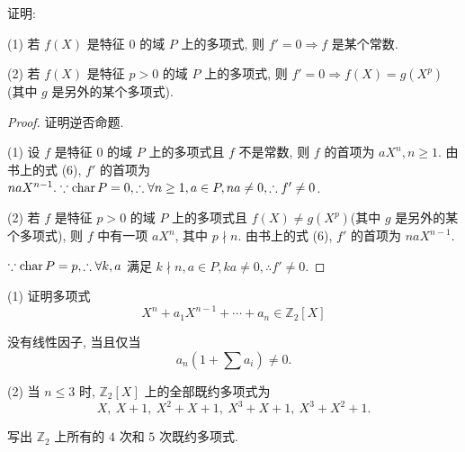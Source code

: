 \documentclass[color=black,device=normal,lang=cn,mode=geye]{elegantnote}
\begin{document}
\begin{exercise}%
    证明:
    
    (1) 若 $f(X)$ 是特征 $0$ 的域 $P$ 上的多项式, 则 $f'=0\Rightarrow f$ 是某个常数.
    
    (2) 若 $f(X)$ 是特征 $p>0$ 的域 $P$ 上的多项式, 则 $f'=0\Rightarrow f(X)=g(X^p)$(其中 $g$ 是另外的某个多项式).
\end{exercise}
\begin{proof}
    证明逆否命题.

    (1) 设 $f$ 是特征 $0$ 的域 $P$ 上的多项式且 $f$ 不是常数, 则 $f$ 的首项为 $aX^n,n\geq1$. 由书上的式 (6), $f'$ 的首项为 $naX^{n-1}.\because\operatorname{char} P=0,\therefore\forall n\geq1,a\in P,na\neq0,\therefore f'\neq0$.

    (2) 若 $f$ 是特征 $p>0$ 的域 $P$ 上的多项式且 $f(X)\neq g(X^p)$(其中 $g$ 是另外的某个多项式), 则 $f$ 中有一项 $aX^n$, 其中 $p\nmid n$. 由书上的式 (6), $f'$ 的首项为 $naX^{n-1}$.
    
    $\because\operatorname{char} P=p,\therefore\forall k,a$ 满足 $k\nmid n,a\in P,ka\neq0,\therefore f'\neq0$.
\end{proof}
\addtocounter{exercise}{2}
\begin{exercise}%
    (1) 证明多项式
    \begin{equation}\label{eq5.1}
        X^n+a_1X^{n-1}+\cdots+a_n\in\mathbb{Z}_2[X]
    \end{equation}

    没有线性因子, 当且仅当
    \[a_n(1+\sum a_i)\neq0.\]

    (2) 当 $n\leq3$ 时, $\mathbb{Z}_2[X]$ 上的全部既约多项式为
    \[X,\ X+1,\ X^2+X+1,\ X^3+X+1,\ X^3+X^2+1.\]

    写出 $\mathbb{Z}_2$ 上所有的 $4$ 次和 $5$ 次既约多项式.
\end{exercise}
\end{document}
